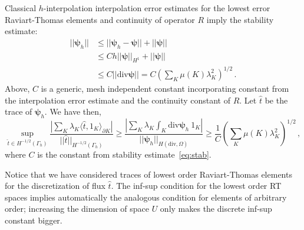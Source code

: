 \documentclass[letterpaper]{article}
\newcommand{\ptl}{{\partial}}
\newcommand{\bfpsi}{\boldsymbol\psi}
\begin{document}
Classical $h$-interpolation interpolation error estimates for the lowest error
Raviart-Thomas elements and continuity of operator $R$ imply the stability estimate:
\begin{equation}
\begin{array}{lll}
|| \bfpsi_h || & \leq || \bfpsi_h - \bfpsi || + || \bfpsi ||\\[8pt]
&\leq C h || \bfpsi ||_{H^1} +  || \bfpsi || \\[8pt]
& \leq C || \text{div} \bfpsi || = C (\sum_K \mu(K) \lambda_K^2)^{1/2}\,.
\end{array}
\label{eq:stab}
\end{equation}
Above, $C$ is a generic, mesh independent constant incorporating constant from
the interpolation error estimate and the continuity constant of $R$.
Let $\hat{t}$ be the trace of $\bfpsi_h$. We have then,
\begin{equation}
\sup_{\hat{t} \in H^{-1/2}(\Gamma_h)} \frac{|  \sum_K \lambda_K \langle
\hat{t},1_K \rangle_{\ptl K} |}{|| \hat{t} ||_{H^{-1/2}(\Gamma_h)}}
\geq \frac{| \sum_K \lambda_K \int_K \text{div} \bfpsi_h \: 1_K  |}
{|| \bfpsi_h ||_{H(\text{div},\Omega)}}
\geq \frac{1}{C} (\sum_K \mu(K) \lambda_K^2)^{1/2}\,,
\end{equation}
where $C$ is the constant from stability estimate~\eqref{eq:stab}.

Notice that we have considered traces of lowest order Raviart-Thomas elements
for the discretization of flux $\hat{t}$. The inf-sup condition for the lowest
order RT spaces implies automatically the analogous condition for elements of
arbitrary order; increasing the dimension of space $U$ only makes the discrete
inf-sup constant bigger.
\end{document}
